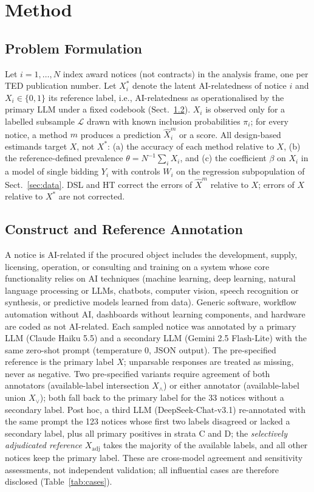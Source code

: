 \documentclass[runningheads]{llncs}
\begin{document}
\section{Method}
\subsection{Problem Formulation}
Let $i=1,\dots,N$ index award notices (not contracts) in the analysis frame, one per TED publication number. Let $X_i^*$ denote the latent AI-relatedness of notice $i$ and $X_i\in\{0,1\}$ its reference label, i.e., AI-relatedness as operationalised by the primary LLM under a fixed codebook (Sect.~\ref{sec:ref}). $X_i$ is observed only for a labelled subsample $\mathcal{L}$ drawn with known inclusion probabilities $\pi_i$; for every notice, a method $m$ produces a prediction $\hat{X}^m_i$ or a score. All design-based estimands target $X$, not $X^*$: (a) the accuracy of each method relative to $X$, (b) the reference-defined prevalence $\theta=N^{-1}\sum_i X_i$, and (c) the coefficient $\beta$ on $X_i$ in a model of single bidding $Y_i$ with controls $W_i$ on the regression subpopulation of Sect.~\ref{sec:data}. DSL and HT correct the errors of $\hat{X}^m$ relative to $X$; errors of $X$ relative to $X^*$ are not corrected.

\subsection{Construct and Reference Annotation}
\label{sec:ref}
A notice is AI-related if the procured object includes the development, supply, licensing, operation, or consulting and training on a system whose core functionality relies on AI techniques (machine learning, deep learning, natural language processing or LLMs, chatbots, computer vision, speech recognition or synthesis, or predictive models learned from data). Generic software, workflow automation without AI, dashboards without learning components, and hardware are coded as not AI-related. Each sampled notice was annotated by a primary LLM (Claude Haiku 5.5) and a secondary LLM (Gemini 2.5 Flash-Lite) with the same zero-shot prompt (temperature 0, JSON output). The pre-specified reference is the primary label $X$; unparsable responses are treated as missing, never as negative. Two pre-specified variants require agreement of both annotators (available-label intersection $X_\wedge$) or either annotator (available-label union $X_\vee$); both fall back to the primary label for the 33 notices without a secondary label. Post hoc, a third LLM (DeepSeek-Chat-v3.1) re-annotated with the same prompt the 123 notices whose first two labels disagreed or lacked a secondary label, plus all primary positives in strata C and D; the \emph{selectively adjudicated reference} $X_{\mathrm{adj}}$ takes the majority of the available labels, and all other notices keep the primary label. These are cross-model agreement and sensitivity assessments, not independent validation; all influential cases are therefore disclosed (Table~\ref{tab:cases}).
\end{document}
